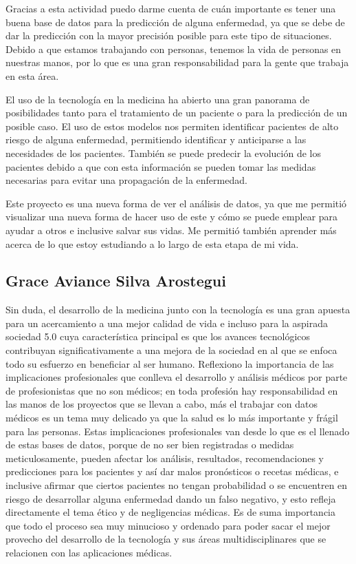 \documentclass[journal]{IEEEtran}                                                          %
\begin{document}
            Gracias a esta actividad puedo darme cuenta de cuán importante es tener una buena base de datos para la predicción de alguna enfermedad, ya que se debe de dar la predicción con la mayor precisión posible para este tipo de situaciones. Debido a que estamos trabajando con personas, tenemos la vida de personas en nuestras manos, por lo que es una gran responsabilidad para la gente que trabaja en esta área.

            El uso de la tecnología en la medicina ha abierto una gran panorama de posibilidades tanto para el tratamiento de un paciente o para la predicción de un posible caso. El uso de estos modelos nos permiten identificar pacientes de alto riesgo de alguna enfermedad, permitiendo identificar y anticiparse a las necesidades de los pacientes. También se puede predecir la evolución de los pacientes debido a que con esta información se pueden tomar las medidas necesarias para evitar una propagación de la enfermedad.

            Este proyecto es una nueva forma de ver el análisis de datos, ya que me permitió visualizar una nueva forma de hacer uso de este y cómo se puede emplear para ayudar a otros e inclusive salvar sus vidas. Me permitió también aprender más acerca de lo que estoy estudiando a lo largo de esta etapa de mi vida.
        
        \subsection{Grace Aviance Silva Arostegui}

            Sin duda, el desarrollo de la medicina junto con la tecnología es una gran apuesta para un acercamiento a una mejor calidad de vida e incluso para la aspirada sociedad 5.0 cuya característica principal es que los avances tecnológicos contribuyan significativamente a una mejora de la sociedad en al que se enfoca todo su esfuerzo en beneficiar al ser humano. Reflexiono la importancia de las implicaciones profesionales que conlleva el desarrollo y análisis médicos por parte de profesionistas que no son médicos; en toda profesión hay responsabilidad en las manos de los proyectos que se llevan a cabo, más el trabajar con datos médicos es un tema muy delicado ya que la salud es lo más importante y frágil para las personas. Estas implicaciones profesionales van desde lo que es el llenado de estas bases de datos, porque de no ser bien registradas o medidas meticulosamente, pueden afectar los análisis, resultados, recomendaciones y predicciones para los pacientes y así dar malos pronósticos o recetas médicas, e inclusive afirmar que ciertos pacientes no tengan probabilidad o se encuentren en riesgo de desarrollar alguna enfermedad dando un falso negativo, y esto refleja directamente el tema ético y de negligencias médicas. Es de suma importancia que todo el proceso sea muy minucioso y ordenado para poder sacar el mejor provecho del desarrollo de la tecnología y sus áreas multidisciplinares que se relacionen con las aplicaciones médicas.
\end{document}
